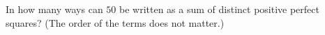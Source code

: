 In how many ways can $50$ be written as a sum of distinct positive perfect squares? (The order of the terms does not matter.)
